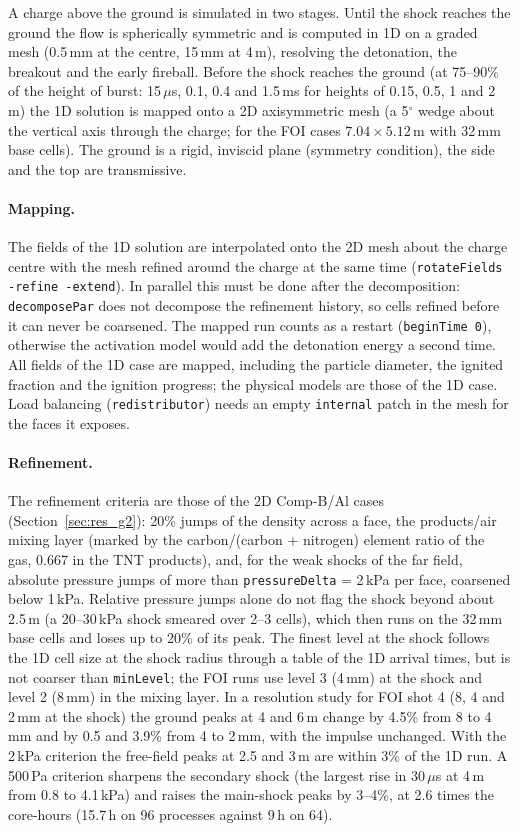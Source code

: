 \documentclass{article}
\begin{document}
A charge above the ground is simulated in two stages. Until the shock reaches the ground the flow is spherically symmetric and is computed in 1D on a graded mesh (0.5\,mm at the centre, 15\,mm at 4\,m), resolving the detonation, the breakout and the early fireball. Before the shock reaches the ground (at 75--90\% of the height of burst: 15\,$\mu$s, 0.1, 0.4 and 1.5\,ms for heights of 0.15, 0.5, 1 and 2\,m) the 1D solution is mapped onto a 2D axisymmetric mesh (a 5$^\circ$ wedge about the vertical axis through the charge; for the FOI cases $7.04\times5.12$\,m with 32\,mm base cells). The ground is a rigid, inviscid plane (symmetry condition), the side and the top are transmissive.

\paragraph{Mapping.} The fields of the 1D solution are interpolated onto the 2D mesh about the charge centre with the mesh refined around the charge at the same time (\texttt{rotateFields -refine -extend}). In parallel this must be done after the decomposition: \texttt{decomposePar} does not decompose the refinement history, so cells refined before it can never be coarsened. The mapped run counts as a restart (\texttt{beginTime 0}), otherwise the activation model would add the detonation energy a second time. All fields of the 1D case are mapped, including the particle diameter, the ignited fraction and the ignition progress; the physical models are those of the 1D case. Load balancing (\texttt{redistributor}) needs an empty \texttt{internal} patch in the mesh for the faces it exposes.

\paragraph{Refinement.} The refinement criteria are those of the 2D Comp-B/Al cases (Section~\ref{sec:res_g2}): 20\% jumps of the density across a face, the products/air mixing layer (marked by the carbon/(carbon + nitrogen) element ratio of the gas, 0.667 in the TNT products), and, for the weak shocks of the far field, absolute pressure jumps of more than \texttt{pressureDelta} = 2\,kPa per face, coarsened below 1\,kPa. Relative pressure jumps alone do not flag the shock beyond about 2.5\,m (a 20--30\,kPa shock smeared over 2--3 cells), which then runs on the 32\,mm base cells and loses up to 20\% of its peak. The finest level at the shock follows the 1D cell size at the shock radius through a table of the 1D arrival times, but is not coarser than \texttt{minLevel}; the FOI runs use level 3 (4\,mm) at the shock and level 2 (8\,mm) in the mixing layer. In a resolution study for FOI shot 4 (8, 4 and 2\,mm at the shock) the ground peaks at 4 and 6\,m change by 4.5\% from 8 to 4\,mm and by 0.5 and 3.9\% from 4 to 2\,mm, with the impulse unchanged. With the 2\,kPa criterion the free-field peaks at 2.5 and 3\,m are within 3\% of the 1D run. A 500\,Pa criterion sharpens the secondary shock (the largest rise in 30\,$\mu$s at 4\,m from 0.8 to 4.1\,kPa) and raises the main-shock peaks by 3--4\%, at 2.6 times the core-hours (15.7\,h on 96 processes against 9\,h on 64).
\end{document}
